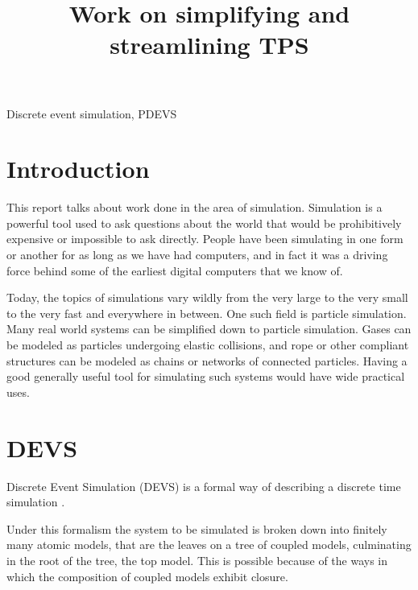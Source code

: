 \documentclass[conference]{IEEEtran}
\begin{document}
\title{Work on simplifying and streamlining TPS}

\author{
}

\maketitle

\begin{IEEEkeywords}
Discrete event simulation, PDEVS
\end{IEEEkeywords}

\section{Introduction}

This report talks about work done in the area of simulation. Simulation is a powerful tool used to ask questions about the world that would be prohibitively expensive or impossible to ask directly. People have been simulating in one form or another for as long as we have had computers, and in fact it was a driving force behind some of the earliest digital computers that we know of. 

Today, the topics of simulations vary wildly from the very large to the very small to the very fast and everywhere in between. One such field is particle simulation. Many real world systems can be simplified down to particle simulation. Gases can be modeled as particles undergoing elastic collisions, and rope or other compliant structures can be modeled as chains or networks of connected particles. Having a good generally useful tool for simulating such systems would have wide practical uses.

\section{DEVS}

Discrete Event Simulation (DEVS) is a formal way of describing a discrete time simulation \cite{devs}. 

Under this formalism the system to be simulated is broken down into finitely many atomic models, that are the leaves on a tree of coupled models, culminating in the root of the tree, the top model. This is possible because of the ways in which the composition of coupled models exhibit closure. 
\end{document}
